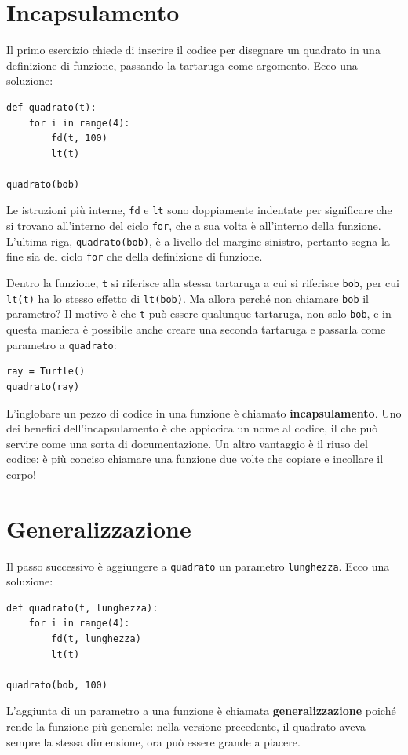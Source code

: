 \documentclass[10pt]{book}
\begin{document}
\section{Incapsulamento}

Il primo esercizio chiede di inserire il codice per disegnare un quadrato in una definizione di funzione, passando la tartaruga come argomento. Ecco una soluzione:

\begin{verbatim}
def quadrato(t):
    for i in range(4):
        fd(t, 100)
        lt(t)

quadrato(bob)
\end{verbatim}
%
Le istruzioni più interne, {\tt fd} e {\tt lt} sono doppiamente indentate per significare che si trovano all'interno del ciclo {\tt for}, che a sua volta è all'interno della funzione. L'ultima riga, {\tt quadrato(bob)}, è a livello del margine sinistro, pertanto segna la fine sia del ciclo {\tt for} che della definizione di funzione.

Dentro la funzione, {\tt t} si riferisce alla stessa tartaruga a cui si riferisce {\tt bob}, per cui {\tt lt(t)} ha lo stesso effetto di {\tt lt(bob)}.
Ma allora perché non chiamare {\tt bob} il parametro? Il motivo è che {\tt t}
può essere qualunque tartaruga, non solo {\tt bob}, e in questa maniera è possibile anche creare una seconda tartaruga e passarla come parametro a {\tt quadrato}:

\begin{verbatim}
ray = Turtle()
quadrato(ray)
\end{verbatim}
%
L'inglobare un pezzo di codice in una funzione è chiamato {\bf incapsulamento}. Uno dei benefici dell'incapsulamento è che appiccica un nome al codice, il che può servire come una sorta di documentazione. Un altro vantaggio è il riuso del codice: è più conciso chiamare una funzione due volte che copiare e incollare il corpo!


\section{Generalizzazione}

Il passo successivo è aggiungere a {\tt quadrato} un parametro {\tt lunghezza}.
Ecco una soluzione:

\begin{verbatim}
def quadrato(t, lunghezza):
    for i in range(4):
        fd(t, lunghezza)
        lt(t)

quadrato(bob, 100)
\end{verbatim}
%
L'aggiunta di un parametro a una funzione è chiamata {\bf generalizzazione}
poiché rende la funzione più generale: nella versione precedente, il quadrato aveva sempre la stessa dimensione, ora può essere grande a piacere.
\end{document}
